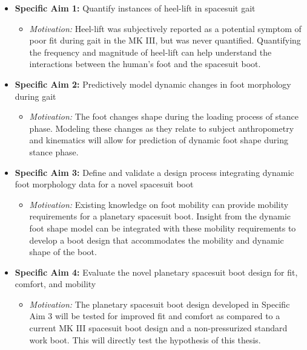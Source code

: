 \documentclass[defaultstyle,11pt]{thesis}
\providecommand{\tightlist}{%
  \setlength{\itemsep}{0pt}\setlength{\parskip}{0pt}}
\begin{document}
\begin{itemize}
\tightlist
\item
  \textbf{Specific Aim 1:} Quantify instances of heel-lift in spacesuit gait

  \begin{itemize}
  \tightlist
  \item
    \emph{Motivation:} Heel-lift was subjectively reported as a potential symptom of poor fit during gait in the MK III, but was never quantified.
    Quantifying the frequency and magnitude of heel-lift can help understand the interactions between the human's foot and the spacesuit boot.
  \end{itemize}
\item
  \textbf{Specific Aim 2:} Predictively model dynamic changes in foot morphology during gait

  \begin{itemize}
  \tightlist
  \item
    \emph{Motivation:} The foot changes shape during the loading process of stance phase.
    Modeling these changes as they relate to subject anthropometry and kinematics will allow for prediction of dynamic foot shape during stance phase.
  \end{itemize}
\item
  \textbf{Specific Aim 3:} Define and validate a design process integrating dynamic foot morphology data for a novel spacesuit boot

  \begin{itemize}
  \tightlist
  \item
    \emph{Motivation:} Existing knowledge on foot mobility can provide mobility requirements for a planetary spacesuit boot.
    Insight from the dynamic foot shape model can be integrated with these mobility requirements to develop a boot design that accommodates the mobility and dynamic shape of the boot.
  \end{itemize}
\item
  \textbf{Specific Aim 4:} Evaluate the novel planetary spacesuit boot design for fit, comfort, and mobility

  \begin{itemize}
  \tightlist
  \item
    \emph{Motivation:} The planetary spacesuit boot design developed in Specific Aim 3 will be tested for improved fit and comfort as compared to a current MK III spacesuit boot design and a non-pressurized standard work boot.
    This will directly test the hypothesis of this thesis.
  \end{itemize}
\end{itemize}
\end{document}
